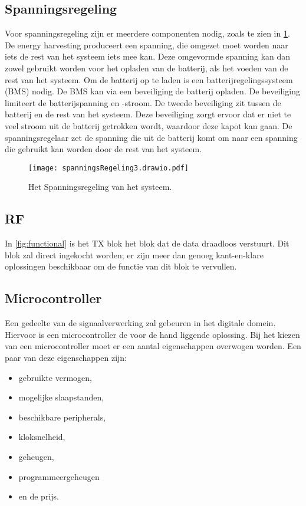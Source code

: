 \subsection{Spanningsregeling}
Voor spanningsregeling zijn er meerdere componenten nodig, zoals te zien in \cref{fig:spanningsregeling}. De energy harvesting produceert een spanning, die omgezet moet worden naar iets de rest van het systeem iets mee kan. Deze omgevormde spanning kan dan zowel gebruikt worden voor het opladen van de batterij, als het voeden van de rest van het systeem.
Om de batterij op te laden is een batterijregelingssysteem (BMS) nodig. De BMS kan via een beveiliging de batterij opladen. De beveiliging limiteert de batterijspanning en -stroom. De tweede beveiliging zit tussen de batterij en de rest van het systeem. Deze beveiliging zorgt ervoor dat er niet te veel stroom uit de batterij getrokken wordt, waardoor deze kapot kan gaan. De spanningsregelaar zet de spanning die uit de batterij komt om naar een spanning die gebruikt kan worden door de rest van het systeem.

\begin{figure}[!htbp]
    \centering
    \texttt{[image: spanningsRegeling3.drawio.pdf]}
    \caption{Het Spanningsregeling van het systeem.}
    \label{fig:spanningsregeling}
\end{figure}

\subsection{RF}
In \cref{fig:functional} is het TX blok het blok dat de data draadloos verstuurt. Dit blok zal direct ingekocht worden; er zijn meer dan genoeg kant-en-klare oplossingen beschikbaar om de functie van dit blok te vervullen.


\subsection{Microcontroller}
Een gedeelte van de signaalverwerking zal gebeuren in het digitale domein. Hiervoor is een microcontroller de voor de hand liggende oplossing. Bij het kiezen van een microcontroller moet er een aantal eigenschappen overwogen worden. Een paar van deze eigenschappen zijn:
\begin{itemize}
    \item gebruikte vermogen,
    \item mogelijke slaapstanden,
    \item beschikbare peripherals,
    \item kloksnelheid,
    \item geheugen,
    \item programmeergeheugen
    \item en de prijs.
\end{itemize}
